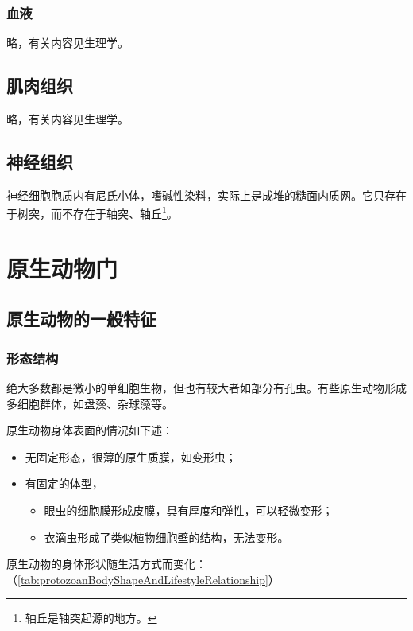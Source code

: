 \subsubsection{血液}

略，有关内容见生理学。

\subsection{肌肉组织}

略，有关内容见生理学。

\subsection{神经组织}

神经细胞胞质内有尼氏小体，嗜碱性染料，实际上是成堆的糙面内质网。它只存在于树突，而不存在于轴突、轴丘\footnote{轴丘是轴突起源的地方。}。

\section{原生动物门}

\subsection{原生动物的一般特征}

\subsubsection{形态结构}

绝大多数都是微小的单细胞生物，但也有较大者如部分有孔虫。有些原生动物形成多细胞群体，如盘藻、杂球藻等。

原生动物身体表面的情况如下述：
\begin{itemize}
	\item 无固定形态，很薄的原生质膜，如变形虫；
	\item 有固定的体型，
	\begin{itemize}
		\item 眼虫的细胞膜形成皮膜，具有厚度和弹性，可以轻微变形；
		\item 衣滴虫形成了类似植物细胞壁的结构，无法变形。
	\end{itemize}
\end{itemize}

原生动物的身体形状随生活方式而变化：（\autoref{tab:protozoanBodyShapeAndLifestyleRelationship}）

